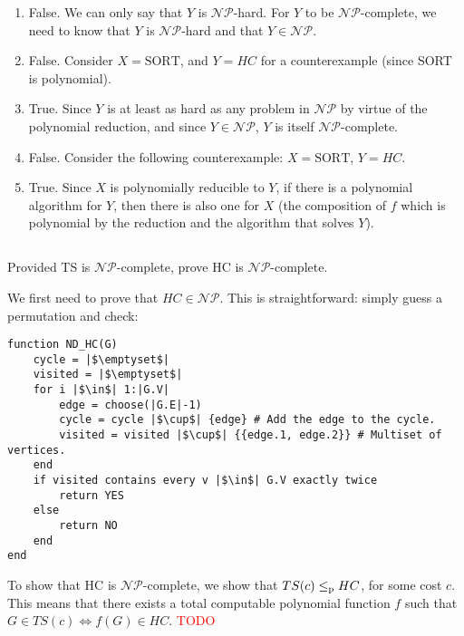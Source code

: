 \begin{solution}
	\begin{enumerate}
		\item False.
		We can only say that \(Y\) is \(\mathcal{NP}\)-hard.
		For \(Y\) to be \(\mathcal{NP}\)-complete,
		we need to know that \(Y\) is \(\mathcal{NP}\)-hard
		and that \(Y \in \mathcal{NP}\).
		\item False.
		Consider \(X = \mathrm{SORT}\),
		and \(Y = HC\) for a counterexample
		(since SORT is polynomial).
		\item True.
		Since \(Y\) is at least as hard
		as any problem in \(\mathcal{NP}\)
		by virtue of the polynomial reduction,
		and since \(Y \in \mathcal{NP}\),
		\(Y\) is itself \(\mathcal{NP}\)-complete.
		\item False.
		Consider the following counterexample:
		\(X = \mathrm{SORT}\), \(Y = HC\).
		\item True.
		Since \(X\) is polynomially reducible to \(Y\),
		if there is a polynomial algorithm for \(Y\),
		then there is also one for \(X\)
		(the composition of \(f\) which is polynomial by the reduction
		and the algorithm that solves \(Y\)).
	\end{enumerate}
\end{solution}

\subsection{} %
Provided TS is \(\mathcal{NP}\)-complete, prove HC is \(\mathcal{NP}\)-complete.

\begin{solution}
We first need to prove that \(HC \in \mathcal{NP}\).
This is straightforward: simply guess a permutation and check:
\begin{verbatim}
function ND_HC(G)
	cycle = |$\emptyset$|
	visited = |$\emptyset$|
	for i |$\in$| 1:|G.V|
		edge = choose(|G.E|-1)
		cycle = cycle |$\cup$| {edge} # Add the edge to the cycle.
		visited = visited |$\cup$| {{edge.1, edge.2}} # Multiset of vertices.
	end
	if visited contains every v |$\in$| G.V exactly twice
		return YES
	else
		return NO
	end
end
\end{verbatim}

To show that HC is \(\mathcal{NP}\)-complete,
we show that \(TS(c) \le_\textnormal{p} HC\), for some cost \(c\).
This means that there exists a total computable polynomial function \(f\)
such that \(G \in TS(c) \iff f(G) \in HC\).
\textcolor{red}{TODO}
\end{solution}
